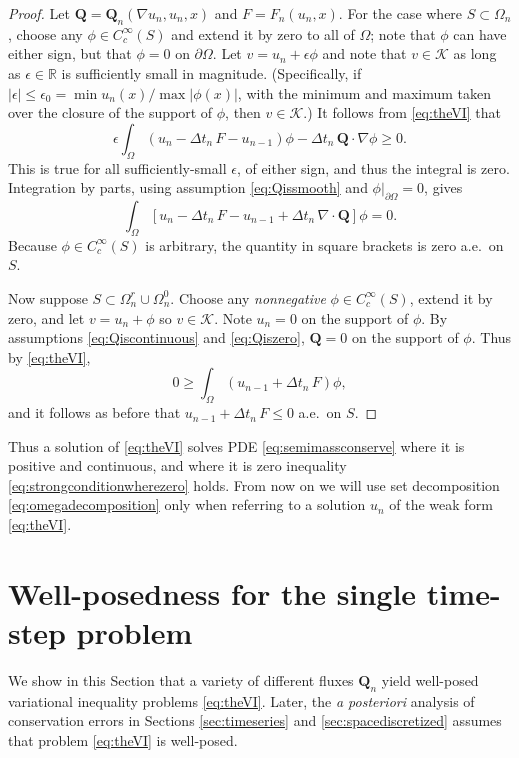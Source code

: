\documentclass[final,onefignum]{siamart190516}
\newcommand\bQ{\mathbf{Q}}
\newcommand{\Div}{\nabla\cdot}
\newcommand\eps{\epsilon}
\newcommand{\grad}{\nabla}
\newcommand\RR{\mathbb{R}}
\begin{document}
\begin{proof}  Let $\bQ = \bQ_n(\grad u_n,u_n,x)$ and $F=F_n(u_n,x)$.  For the case where $S \subset \Omega_n$, choose any $\phi\in C_c^\infty(S)$ and extend it by zero to all of $\Omega$; note that $\phi$ can have either sign, but that $\phi=0$ on $\partial\Omega$.  Let $v = u_n + \eps \phi$ and note that $v \in \mathcal{K}$ as long as $\eps\in\RR$ is sufficiently small in magnitude.  (Specifically, if $|\eps|\le \eps_0 = \min u_n(x) / \max |\phi(x)|$, with the minimum and maximum taken over the closure of the support of $\phi$, then $v \in \mathcal{K}$.)  It follows from \eqref{eq:theVI} that
   $$\eps \int_\Omega \left(u_n - \Delta t_n\,F - u_{n-1}\right)\phi - \Delta t_n\,\bQ \cdot \grad \phi \ge 0.$$
This is true for all sufficiently-small $\eps$, of either sign, and thus the integral is zero.  Integration by parts, using assumption \eqref{eq:Qissmooth} and $\phi\big|_{\partial\Omega}=0$, gives
   $$\int_\Omega \left[ u_n - \Delta t_n\,F - u_{n-1} + \Delta t_n\,\Div\bQ \right]\phi = 0.$$
Because $\phi\in C_c^\infty(S)$ is arbitrary, the quantity in square brackets is zero a.e.~on $S$.

Now suppose $S \subset \Omega_n^r \cup \Omega_n^0$.  Choose any \emph{nonnegative} $\phi\in C_c^\infty(S)$, extend it by zero, and let $v = u_n + \phi$ so $v\in\mathcal{K}$.  Note $u_n=0$ on the support of $\phi$.  By assumptions \eqref{eq:Qiscontinuous} and \eqref{eq:Qiszero}, $\bQ=0$ on the support of $\phi$.  Thus by \eqref{eq:theVI},
    $$0 \ge \int_{\Omega} \left(u_{n-1} + \Delta t_n\, F\right) \phi,$$
and it follows as before that $u_{n-1} + \Delta t_n\, F \le 0$ a.e.~on $S$. \end{proof}

Thus a solution of \eqref{eq:theVI} solves PDE \eqref{eq:semimassconserve} where it is positive and continuous, and where it is zero inequality \eqref{eq:strongconditionwherezero} holds.  From now on we will use set decomposition \eqref{eq:omegadecomposition} only when referring to a solution $u_n$ of the weak form \eqref{eq:theVI}.


\section{Well-posedness for the single time-step problem} \label{sec:wellposed}

We show in this Section that a variety of different fluxes $\bQ_n$ yield well-posed variational inequality problems \eqref{eq:theVI}.  Later, the \emph{a posteriori} analysis of conservation errors in Sections \ref{sec:timeseries} and \ref{sec:spacediscretized} assumes that problem \eqref{eq:theVI} is well-posed.
\end{document}
